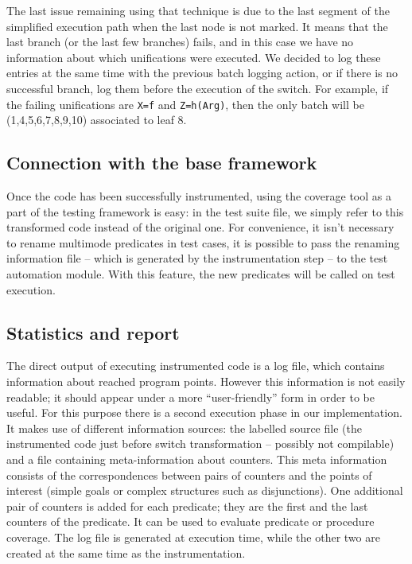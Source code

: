 \documentclass[british]{llncs}
\begin{document}
The last issue remaining using that technique is due to the last segment of the simplified
execution path when the last node is not marked. It means that the
last branch (or the last few branches) fails, and in this case we
have no information about which unifications were executed. We
decided to log these entries at the same time with the previous batch
logging action, or if there is no successful branch, log
them before the execution of the switch. For example, if the failing
unifications are \texttt{X=f} and \texttt{Z=h(Arg)}, then the only
batch will be (1,4,5,6,7,8,9,10) associated to leaf 8. 



\subsection{Connection with the base framework}

Once the code has been successfully instrumented, using the coverage
tool as a part of the testing framework is easy: in the test suite
file, we simply refer to this transformed code instead of the original
one. For
convenience, it isn't necessary to rename multimode predicates in
test cases, it is possible to pass the renaming information file --
which is generated by the instrumentation step -- to the test automation
module. With this feature, the new predicates will be called on test
execution.


\subsection{Statistics and report}

The direct output of executing instrumented code is a log file, which
contains information about reached program points. However this information is not easily readable; it should appear under a more ``user-friendly'' form in order to be useful. For this purpose there is a second execution phase in our implementation. It makes use of different information sources: the labelled source file (the instrumented code just
before switch transformation -- possibly not compilable) and a file containing meta-information about counters. This meta information consists of the correspondences between pairs of counters and the points of interest (simple goals or complex structures such as disjunctions). One additional
pair of counters is added for each predicate; they are the first and the last counters of the predicate. It can be used to evaluate
predicate or procedure coverage. The log file is generated at execution
time, while the other two are created at the same time as the instrumentation.
\end{document}
